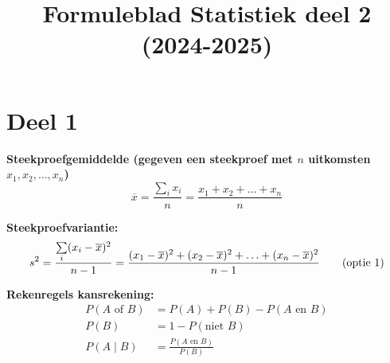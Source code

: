 \documentclass[11pt,a4paper,dutch]{article} %
\title{Formuleblad Statistiek deel 2 (2024-2025)}
\author{}
\date{}
\begin{document}
\maketitle
\vspace{-1cm}
\section*{Deel 1}
\textbf{Steekproefgemiddelde (gegeven een steekproef met $n$ uitkomsten $x_1, x_2, \ldots, x_n$)}
\[
    \overline{x} = \frac{\sum\limits_{i} x_i}{n} = \frac{x_1 + x_2 + \ldots + x_n}{n}
\]

\textbf{Steekproefvariantie:}
\begin{align}
    s^2 &= \frac{\sum\limits_{i} (x_i-\overline{x})^2}{n-1} = \frac{(x_1-\overline{x})^2 + (x_2-\overline{x})^2 + \ldots + (x_n - \overline{x})^2}{n-1} \hfill \tag{optie 1} \\%
\end{align}

\textbf{Rekenregels kansrekening:}
\begin{align*}
    P(A \text{ of } B)      &= P(A) + P(B) - P(A \text{ en } B) \tag{optelregel}\\
    P(B)                    &= 1 - P(\text{niet } B) \tag{complementregel}\\
    P(A \mid B)         &= \frac{P(A \text{ en } B)}{P(B)} \tag{conditionele kansen}
\end{align*}
\end{document}

